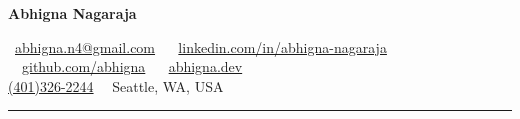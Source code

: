 \documentclass[11pt,letterpaper,hidelinks]{article}
\begin{document}
\begin{center}
{\LARGE \textbf{Abhigna Nagaraja}}

\vspace{0pt}
\small \raisebox{-0.25ex}\Email\ \href{mailto:abhigna.n4@gmail.com}{abhigna.n4@gmail.com}
\ \textbullet\ \small {} \href{https://www.linkedin.com/in/abhigna-nagaraja}{linkedin.com/in/abhigna-nagaraja}
\ \textbullet\ \small {}\href{https://github.com/abhigna}{github.com/abhigna} 
\ \textbullet\ \small {} \href{https://abhigna.dev}{abhigna.dev} \\
\small \href{tel:+14013262244}{(401)326-2244}
\ \textbullet\ \small Seattle, WA, USA

\vspace{-6pt}
\end{center}




\hrule
\end{document}
